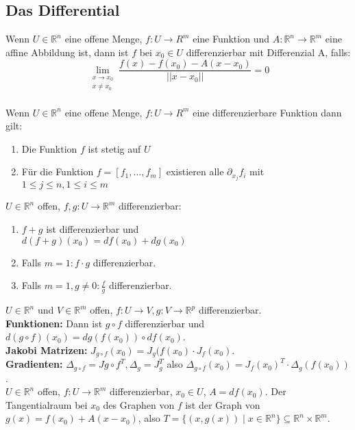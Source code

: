 \subsection{Das Differential}
  Wenn \(U\in\mathbb R^n\) eine offene Menge, \(f:U\rightarrow R^m\) eine Funktion und $A: \mathbb R^n\rightarrow\mathbb R^m$ eine affine Abbildung ist, dann ist $f$ bei $x_0\in U$ differenzierbar mit Differenzial A, falls:
  \[\lim\limits_{\substack{x\rightarrow x_0 \\ x\neq x_0}}\frac{f(x)-f(x_0)-A(x-x_0)}{||x-x_0||}=0\]\\
  Wenn \(U\in\mathbb R^n\) eine offene Menge, \(f:U\rightarrow R^m\) eine differenzierbare Funktion dann gilt:
  \begin{enumerate}
    \item Die Funktion $f$ ist stetig auf $U$
    \item Für die Funktion $f=[f_1,...,f_m]$ existieren alle \(\partial_{x_j}f_i\) mit \(1\leq j \leq n, 1\leq i\leq m\)
  \end{enumerate}
  \(U\in\mathbb R^n\) offen, \(f,g:U\rightarrow\mathbb R^m\) differenzierbar:
  \begin{enumerate}
    \item \(f+g\) ist differenzierbar und \\ $d(f+g)(x_0)=df(x_0)+dg(x_0)$
    \item Falls \(m=1: f\cdot g\) differenzierbar.
    \item Falls \(m=1, g\neq0:\frac f g\) differenzierbar.
  \end{enumerate}
 \(U\in\mathbb R^n\) und \(V\in\mathbb R^m\) offen, \(f:U\rightarrow V, g:V\rightarrow\mathbb R^p\) differenzierbar.\\
\textbf{Funktionen:} 
Dann ist $g\circ f$ differenzierbar und $d(g\circ f)(x_0)=dg(f(x_0))\circ df(x_0)$.\\
\textbf{Jakobi Matrizen:}
\(J_{g\circ f}(x_0)=J_g(f(x_0)\cdot J_f(x_0)\).\\
\textbf{Gradienten:}
\(\Delta_{g\circ f}=J{g\circ f}^T, \Delta_g=J_g^T\) also
\(\Delta_{g\circ f}(x_0)=J_f(x_0)^T\cdot\Delta_g(f(x_0))\).\\
  \(U\in\mathbb{R}^n\) offen, \(f: U\rightarrow\mathbb{R}^m\) differenzierbar, \(x_0\in U\), \(A=df(x_0)\). Der Tangentialraum bei \(x_0\) des Graphen von \(f\) ist der Graph von \(g(x)=f(x_0)+A(x-x_0)\), also \(T=\{(x,g(x))\mid x\in\mathbb{R}^n\}\subseteq\mathbb{R}^n\times\mathbb{R}^m\).\\
